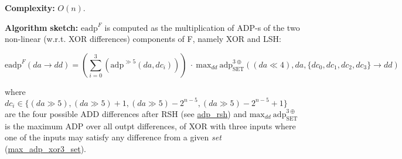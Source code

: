 {\bfseries \-Complexity\-:} $O(n)$.

{\bfseries \-Algorithm} {\bfseries sketch\-:} $\mathrm{eadp}^{F}$ is computed as the multiplication of \-A\-D\-P-\/s of the two non-\/linear (w.\-r.\-t. \-X\-O\-R differences) components of \-F, namely \-X\-O\-R and \-L\-S\-H\-:

\[\mathrm{eadp}^{F}(da \rightarrow dd) = (\sum^3_{i=0} (\mathrm{adp}^{\gg 5}(da, dc_i)))~ \cdot~ \mathrm{max}_{dd}~\mathrm{adp}^{3\oplus}_{\mathrm{SET}}((da \ll 4), da, \{dc_0, dc_1, dc_2, dc_3\} \rightarrow dd)\]

where $dc_i \in \{(da \gg 5), (da \gg 5) + 1, (da \gg 5) - 2^{n-5}, (da \gg 5) - 2^{n-5} + 1\}$ are the four possible \-A\-D\-D differences after \-R\-S\-H (see \hyperlink{adp-shift_8hh_a06fffd781af6662482922889bc562caf}{adp\-\_\-rsh}) and $\mathrm{max}_{dd}~\mathrm{adp}^{3\oplus}_{\mathrm{SET}}$ is the maximum \-A\-D\-P over all outpt differences, of \-X\-O\-R with three inputs where one of the inputs may satisfy any difference from a given {\itshape set\/} (\hyperlink{max-adp-xor3-set_8hh_a64619e5349dd07dc017b0469b4066fce}{max\-\_\-adp\-\_\-xor3\-\_\-set}).


